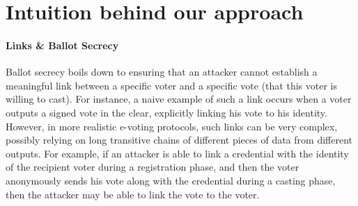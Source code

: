 % 
% 



\section{Intuition behind our approach}
\label{sec:intuition}

\paragraph{\textbf{Links \& Ballot Secrecy}}
Ballot secrecy boils down to ensuring that an attacker cannot establish a
meaningful link between a specific
voter and a specific vote (that this voter is willing to cast).
For instance, a naive example of such a link occurs when
a voter outputs a signed vote in the clear, explicitly linking
his vote to his identity.
However, in more realistic e-voting protocols, such links can be very
complex, possibly relying on long transitive chains
of different pieces of data from different outputs. For example,
if an attacker is able to link
a credential with the identity of the recipient voter during a registration
phase,
and then the voter anonymously sends
his vote along with the credential during a casting phase,
then the attacker may be able to link the vote to the voter.

